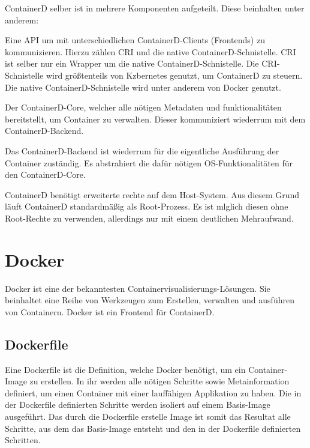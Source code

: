 \begin{figure}[H]
\end{figure}


ContainerD selber ist in mehrere Komponenten aufgeteilt. Diese beinhalten unter anderem:

Eine API um mit unterschiedlichen ContainerD-Clients (Frontends) zu kommunizieren. Hierzu zählen CRI und die native ContainerD-Schnistelle. CRI ist selber nur ein Wrapper um die native ContainerD-Schnistelle. Die CRI-Schnistelle wird größtenteils von Kzbernetes genutzt, um ContainerD zu steuern. Die native ContainerD-Schnistelle wird unter anderem von Docker genutzt.

Der ContainerD-Core, welcher alle nötigen Metadaten und funktionalitäten bereitstellt, um Container zu verwalten. Dieser kommuniziert wiederrum mit dem ContainerD-Backend.

Das ContainerD-Backend ist wiederrum für die eigentliche Ausführung der Container zuständig. Es abstrahiert die dafür nötigen OS-Funktionalitäten für den ContainerD-Core.

ContainerD benötigt erweiterte rechte auf dem Host-System. Aus diesem Grund läuft ContainerD standardmäßig als Root-Prozess. Es ist mlglich diesen ohne Root-Rechte zu verwenden, allerdings nur mit einem deutlichen Mehraufwand.

\section{Docker}

Docker ist eine der bekanntesten Containervisualisierungs-Lösungen. Sie beinhaltet eine Reihe von Werkzeugen zum Erstellen, verwalten und ausführen von Containern. Docker ist ein Frontend für ContainerD.

\subsection{Dockerfile}

Eine Dockerfile ist die Definition, welche Docker benötigt, um ein Container-Image zu erstellen. In ihr werden alle nötigen Schritte sowie Metainformation definiert, um einen Container mit einer lauffähigen Applikation zu haben. Die in der Dockerfile definierten Schritte werden isoliert auf einem Basis-Image ausgeführt. Das durch die Dockerfile erstelle Image ist somit das Resultat alle Schritte, aus dem das Basis-Image entsteht und den in der Dockerfile definierten Schritten.

